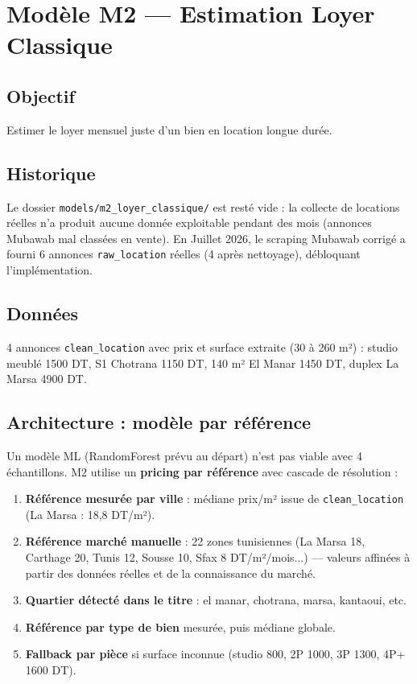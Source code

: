\documentclass[12pt,a4paper]{report}
\begin{document}
\section{Modèle M2 — Estimation Loyer Classique}

\subsection{Objectif}
Estimer le loyer mensuel juste d'un bien en location longue durée.

\subsection{Historique}
Le dossier \texttt{models/m2\_loyer\_classique/} est resté vide : la collecte de locations réelles n'a produit aucune donnée exploitable pendant des mois (annonces Mubawab mal classées en vente). En Juillet 2026, le scraping Mubawab corrigé a fourni 6 annonces \texttt{raw\_location} réelles (4 après nettoyage), débloquant l'implémentation.

\subsection{Données}
4 annonces \texttt{clean\_location} avec prix et surface extraite (30 à 260 m²) : studio meublé 1500 DT, S1 Chotrana 1150 DT, 140 m² El Manar 1450 DT, duplex La Marsa 4900 DT.

\subsection{Architecture : modèle par référence}
Un modèle ML (RandomForest prévu au départ) n'est pas viable avec 4 échantillons. M2 utilise un \textbf{pricing par référence} avec cascade de résolution :

\begin{enumerate}
    \item \textbf{Référence mesurée par ville} : médiane prix/m² issue de \texttt{clean\_location} (La Marsa : 18,8 DT/m²).
    \item \textbf{Référence marché manuelle} : 22 zones tunisiennes (La Marsa 18, Carthage 20, Tunis 12, Sousse 10, Sfax 8 DT/m²/mois...) — valeurs affinées à partir des données réelles et de la connaissance du marché.
    \item \textbf{Quartier détecté dans le titre} : el manar, chotrana, marsa, kantaoui, etc.
    \item \textbf{Référence par type de bien} mesurée, puis médiane globale.
    \item \textbf{Fallback par pièce} si surface inconnue (studio 800, 2P 1000, 3P 1300, 4P+ 1600 DT).
\end{enumerate}
\end{document}
